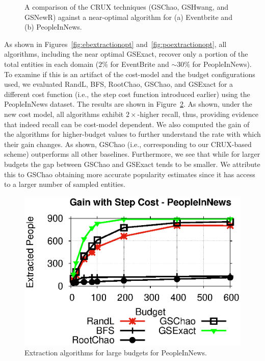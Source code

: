 \begin{figure}
\begin{center}
\end{center}
\caption{A comparison of the CRUX techniques (GSChao, GSHwang, and GSNewR) against a near-optimal algorithm for (a) Eventbrite and (b) PeopleInNews.}
\label{fig:resultsextr2}
\vspace{-10pt}
\end{figure} 
\fi

\iftr
{}
As shown in Figures~\ref{fig:ebextractionopt} and~\ref{fig:poextractionopt}, all algorithms, including the near optimal GSExact, recover only a portion of the total entities in each domain ($2\%$ for EventBrite and $\sim30\%$ for PeopleInNews). To examine if this is an artifact of the cost-model and the budget configurations used, we evaluated RandL, BFS, RootChao, GSChao, and GSExact for a different cost function (i.e., the step cost function introduced earlier) using the PeopleInNews dataset. The results are shown in Figure~\ref{fig:budget}. As shown, under the new cost model, all algorithms exhibit $2\times$-higher recall, thus, providing evidence that indeed recall can be cost-model dependent. We also computed the gain of the algorithms for higher-budget values to further understand the rate with which their gain changes. As shown, GSChao (i.e., corresponding to our CRUX-based scheme) outperforms all other baselines. Furthermore, we see that while for larger budgets the gap between GSChao and GSExact tends to be smaller. We attribute this to GSChao obtaining more accurate popularity estimates since it has access to a larger number of sampled entities.

\begin{figure}[t]
    \begin{center}
    \includegraphics[scale=0.42]{figs/budget.eps}
	\caption{Extraction algorithms for large budgets for PeopleInNews.}\label{fig:budget}
	\end{center}
\end{figure}
\fi


